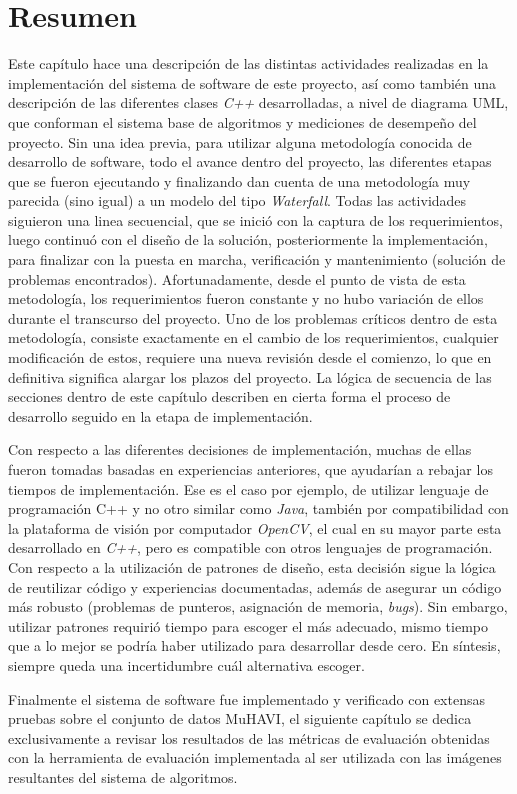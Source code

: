 \section{Resumen}
Este capítulo hace una descripción de las distintas actividades realizadas  en la implementación del sistema de software de este proyecto, así como también una descripción de las diferentes clases \textit{C++} desarrolladas, a nivel de diagrama UML, que conforman el sistema base de algoritmos y mediciones de desempeño del proyecto. Sin una idea previa, para utilizar alguna metodología conocida de desarrollo de software, todo el avance dentro del proyecto, las diferentes etapas que se fueron ejecutando y finalizando dan cuenta de una metodología muy parecida (sino igual) a un modelo del tipo \textit{Waterfall}. Todas las actividades siguieron una linea secuencial, que se inició con la captura de los requerimientos, luego continuó con el diseño de la solución, posteriormente la implementación, para finalizar con la puesta en marcha, verificación y mantenimiento (solución de problemas encontrados). Afortunadamente, desde el punto de vista de esta metodología, los requerimientos fueron constante y no hubo variación de ellos durante el transcurso del proyecto. Uno de los problemas críticos dentro de esta metodología, consiste exactamente en el cambio de los requerimientos, cualquier modificación de estos, requiere una nueva revisión desde el comienzo, lo que en definitiva significa alargar los plazos del proyecto. La lógica de secuencia de las secciones dentro de este capítulo describen en cierta forma el proceso de desarrollo seguido en la etapa de implementación. 

Con respecto a las diferentes decisiones de implementación, muchas de ellas fueron tomadas basadas en experiencias anteriores, que ayudarían a rebajar los tiempos de implementación. Ese es el caso por ejemplo, de utilizar lenguaje de programación C++ y no otro similar como \textit{Java}, también por compatibilidad con la plataforma de visión por computador \textit{OpenCV}, el cual en su mayor parte esta desarrollado en \textit{C++}, pero es compatible con otros lenguajes de programación. Con respecto a la utilización de patrones de diseño, esta decisión sigue la lógica de reutilizar código y experiencias documentadas, además de asegurar un código más robusto (problemas de punteros, asignación de memoria, \textit{bugs}). Sin embargo, utilizar patrones requirió tiempo para escoger el más adecuado, mismo tiempo que a lo mejor se podría haber utilizado para desarrollar desde cero. En síntesis, siempre queda una incertidumbre cuál alternativa escoger. 

Finalmente el sistema de software fue implementado y verificado con extensas pruebas sobre el conjunto de datos MuHAVI, el siguiente capítulo se dedica exclusivamente a revisar los resultados de las métricas de evaluación obtenidas con la herramienta de evaluación implementada al ser utilizada con las imágenes resultantes del sistema de algoritmos.

 
